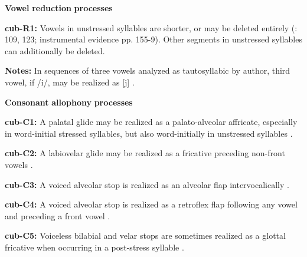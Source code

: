 \documentclass[output=paper]{langsci/langscibook}
\begin{document}
\begin{styleBody}
\textbf{Vowel} \textbf{reduction} \textbf{processes}
\end{styleBody}

\begin{styleBody}
\textbf{cub-R1:} Vowels in unstressed syllables are shorter, or may be deleted entirely (\citealt{Chacon2012}: 109, 123; instrumental evidence pp. 155-9). Other segments in unstressed syllables can additionally be deleted.
\end{styleBody}

\begin{styleBody}
\textbf{Notes:} In sequences of three vowels analyzed as tautosyllabic by author, third vowel, if /i/, may be realized as [j] \citep[52]{Chacon2012}.
\end{styleBody}

\begin{styleBody}
\textbf{Consonant} \textbf{allophony} \textbf{processes}
\end{styleBody}

\begin{styleBody}
\textbf{cub-C1:} A palatal glide may be realized as a palato-alveolar affricate, especially in word-initial stressed syllables, but also word-initially in unstressed syllables \citep[67]{Chacon2012}.
\end{styleBody}

\begin{styleBody}
\textbf{cub-C2:} A labiovelar glide may be realized as a fricative preceding non-front vowels \citep[63]{Chacon2012}.
\end{styleBody}

\begin{styleBody}
\textbf{cub-C3:} A voiced alveolar stop is realized as an alveolar flap intervocalically \citep[63]{Chacon2012}.
\end{styleBody}

\begin{styleBody}
\textbf{cub-C4:} A voiced alveolar stop is realized as a retroflex flap following any vowel and preceding a front vowel \citep[6]{Chacon2012}.
\end{styleBody}

\begin{styleBody}
\textbf{cub-C5:} Voiceless bilabial and velar stops are sometimes realized as a glottal fricative when occurring in a post-stress syllable \citep[123]{Chacon2012}.
\end{styleBody}
\end{document}
